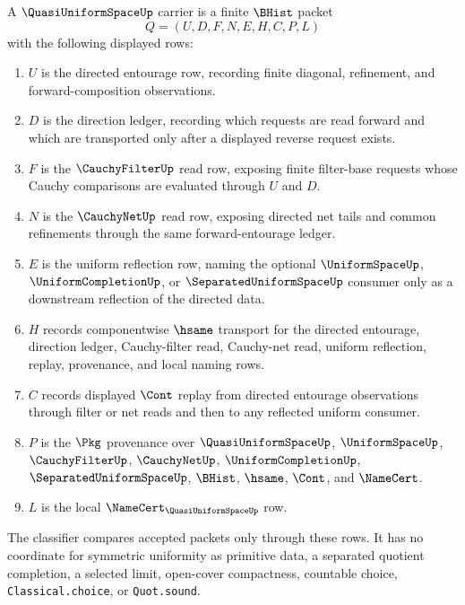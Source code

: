\begin{definition}
\label{def:quasi-uniform-space-carrier}
A $\QuasiUniformSpaceUp$ carrier is a finite $\BHist$ packet
$$
Q=(U,D,F,N,E,H,C,P,L)
$$
with the following displayed rows:
\begin{enumerate}
\item $U$ is the directed entourage row, recording finite diagonal, refinement, and forward-composition observations.
\item $D$ is the direction ledger, recording which requests are read forward and which are transported only after a displayed reverse request exists.
\item $F$ is the $\CauchyFilterUp$ read row, exposing finite filter-base requests whose Cauchy comparisons are evaluated through $U$ and $D$.
\item $N$ is the $\CauchyNetUp$ read row, exposing directed net tails and common refinements through the same forward-entourage ledger.
\item $E$ is the uniform reflection row, naming the optional $\UniformSpaceUp$, $\UniformCompletionUp$, or $\SeparatedUniformSpaceUp$ consumer only as a downstream reflection of the directed data.
\item $H$ records componentwise $\hsame$ transport for the directed entourage, direction ledger, Cauchy-filter read, Cauchy-net read, uniform reflection, replay, provenance, and local naming rows.
\item $C$ records displayed $\Cont$ replay from directed entourage observations through filter or net reads and then to any reflected uniform consumer.
\item $P$ is the $\Pkg$ provenance over $\QuasiUniformSpaceUp$, $\UniformSpaceUp$, $\CauchyFilterUp$, $\CauchyNetUp$, $\UniformCompletionUp$, $\SeparatedUniformSpaceUp$, $\BHist$, $\hsame$, $\Cont$, and $\NameCert$.
\item $L$ is the local $\NameCert_{\QuasiUniformSpaceUp}$ row.
\end{enumerate}
The classifier compares accepted packets only through these rows. It has no coordinate for symmetric uniformity as primitive data, a separated quotient completion, a selected limit, open-cover compactness, countable choice, \texttt{Classical.choice}, or \texttt{Quot.sound}.
\end{definition}

